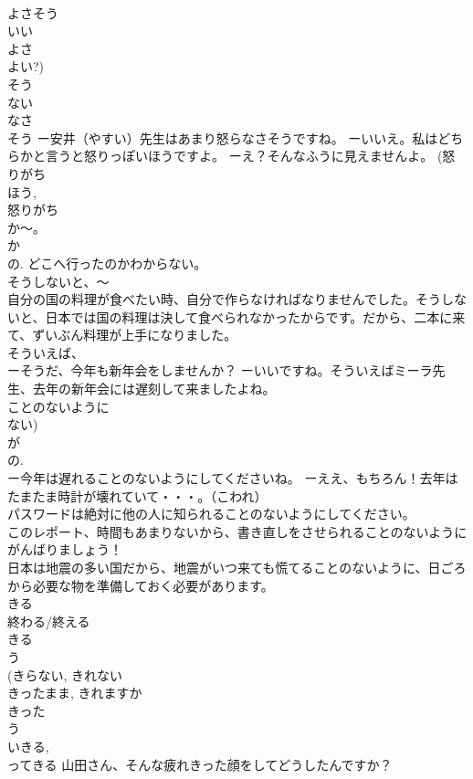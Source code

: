 \documentclass[8pt]{extreport}
\begin{document}
\begin{CJK}{UTF8}{min}
\\	よさそう	
\\	いい 
\\	よさ　
\\	よい?)
\\	そう 
\\	ない 
\\	なさ
\\	そう ー安井（やすい）先生はあまり怒らなさそうですね。 ーいいえ。私はどちらかと言うと怒りっぽいほうですよ。 ーえ？そんなふうに見えませんよ。 (怒りがち 
\\	ほう, 
\\	怒りがち 
\\	か～。	
\\	か 
\\	の. どこへ行ったのかわからない。
\\	そうしないと、～	
\\	自分の国の料理が食べたい時、自分で作らなければなりませんでした。そうしないと、日本では国の料理は決して食べられなかったからです。だから、二本に来て、ずいぶん料理が上手になりました。
\\	そういえば、	
\\	ーそうだ、今年も新年会をしませんか？ ーいいですね。そういえばミーラ先生、去年の新年会には遅刻して来ましたよね。 
\\	ことのないように	
\\	ない) 
\\	が 
\\	の. 
\\	ー今年は遅れることのないようにしてくださいね。 ーええ、もちろん！去年はたまたま時計が壊れていて・・・。（こわれ） 
\\	パスワードは絶対に他の人に知られることのないようにしてください。 
\\	このレポート、時間もあまりないから、書き直しをさせられることのないようにがんばりましょう！ 
\\	日本は地震の多い国だから、地震がいつ来ても慌てることのないように、日ごろから必要な物を準備しておく必要があります。
\\	きる	
\\	終わる/終える 
\\	きる 
\\	う
\\	(きらない, きれない
\\	きったまま, きれますか 
\\	きった
\\	う
\\	いきる, 
\\	ってきる 山田さん、そんな疲れきった顔をしてどうしたんですか？ 

\end{CJK}
\end{document}
